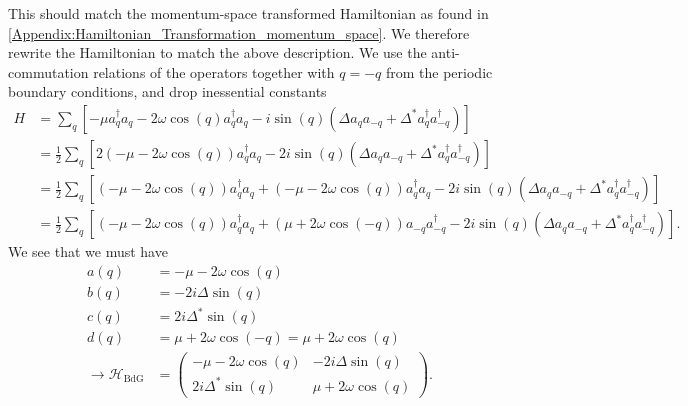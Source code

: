 This should match the momentum-space transformed Hamiltonian as found in \ref{Appendix:Hamiltonian_Transformation_momentum_space}. We therefore rewrite the Hamiltonian to match the above description. We use the anti-commutation relations of the operators together with $q = -q$ from the periodic boundary conditions, and drop inessential constants 
\begin{align}
    H &= \sum_q \left[-\mu a_q^\dagger a_q - 2 \omega \cos(q) a_q^\dagger a_q  - i \sin(q) \left( \Delta a_q a_{-q} + \Delta^* a_q^\dagger a_{-q}^\dagger\right) \right] \\
    &= \frac{1}{2} \sum_q \left[ 2\left(- \mu - 2 \omega \cos(q) \right) a_q^\dagger a_q  - 2 i \sin(q) \left( \Delta a_q a_{-q} + \Delta^* a_q^\dagger a_{-q}^\dagger\right) \right]\\
    &= \frac{1}{2} \sum_q \left[ \left(- \mu - 2 \omega \cos(q) \right) a_q^\dagger a_q + \left(- \mu - 2 \omega \cos(q) \right) a_q^\dagger a_q  - 2 i \sin(q) \left( \Delta a_q a_{-q} + \Delta^* a_q^\dagger a_{-q}^\dagger\right) \right] \\
    &= \frac{1}{2} \sum_q \left[ \left(- \mu - 2 \omega \cos(q) \right) a_q^\dagger a_q + \left(\mu + 2 \omega \cos(-q) \right) a_{-q} a_{-q}^\dagger - 2 i \sin(q) \left( \Delta a_q a_{-q} + \Delta^* a_q^\dagger a_{-q}^\dagger\right) \right].
\end{align}
We see that we must have
\begin{align}
    a(q) &= -\mu -2 \omega \cos(q)\\
    b(q) &= - 2 i \Delta \sin(q) \\
    c(q) &= 2 i \Delta^* \sin(q) \\
    d(q) &= \mu + 2\omega \cos(-q) = \mu + 2\omega \cos(q)\\
    \to \mathcal{H}_\text{BdG} &= \begin{pmatrix}
        -\mu -2 \omega \cos(q) & - 2 i \Delta \sin(q) \\
        2 i \Delta^* \sin(q) & \mu + 2\omega \cos(q)
    \end{pmatrix}.
\end{align}


